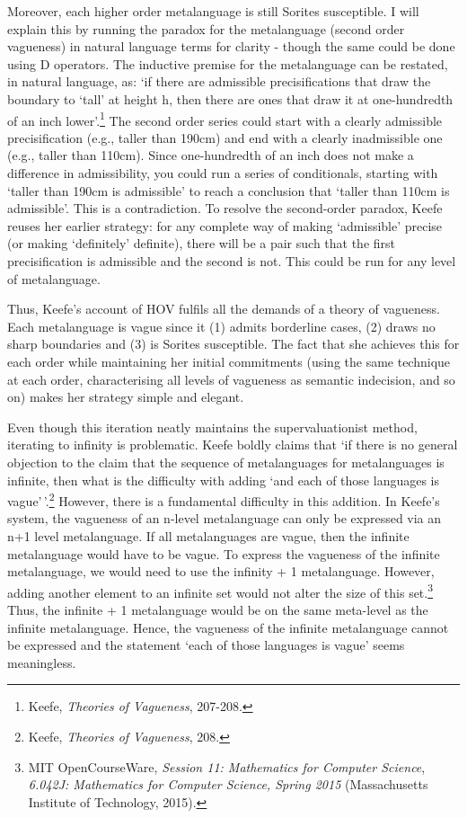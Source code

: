 Moreover, each higher order metalanguage is still Sorites susceptible. I
will explain this by running the paradox for the metalanguage (second
order vagueness) in natural language terms for clarity - though the same
could be done using D operators. The inductive premise for the
metalanguage can be restated, in natural language, as: `if there are
admissible precisifications that draw the boundary to `tall' at height
h, then there are ones that draw it at one-hundredth of an inch
lower'.\footnote{Keefe, \emph{Theories of Vagueness}, 207-208.} The
second order series could start with a clearly admissible
precisification (e.g., taller than 190cm) and end with a clearly
inadmissible one (e.g., taller than 110cm). Since one-hundredth of an
inch does not make a difference in admissibility, you could run a series
of conditionals, starting with `taller than 190cm is admissible' to
reach a conclusion that `taller than 110cm is admissible'. This is a
contradiction. To resolve the second-order paradox, Keefe reuses her
earlier strategy: for any complete way of making `admissible' precise
(or making `definitely' definite), there will be a pair such that the
first precisification is admissible and the second is not. This could be
run for any level of metalanguage.

Thus, Keefe's account of HOV fulfils all the demands of a theory of
vagueness. Each metalanguage is vague since it (1) admits borderline
cases, (2) draws no sharp boundaries and (3) is Sorites susceptible. The
fact that she achieves this for each order while maintaining her initial
commitments (using the same technique at each order, characterising all
levels of vagueness as semantic indecision, and so on) makes her
strategy simple and elegant.

Even though this iteration neatly maintains the supervaluationist
method, iterating to infinity is problematic. Keefe boldly claims that
`if there is no general objection to the claim that the sequence of
metalanguages for metalanguages is infinite, then what is the difficulty
with adding `and each of those languages is vague'\,'.\footnote{Keefe,
  \emph{Theories of Vagueness}, 208.} However, there is a fundamental
difficulty in this addition. In Keefe's system, the vagueness of an
n-level metalanguage can only be expressed via an n+1 level
metalanguage. If all metalanguages are vague, then the infinite
metalanguage would have to be vague. To express the vagueness of the
infinite metalanguage, we would need to use the infinity + 1
metalanguage. However, adding another element to an infinite set would
not alter the size of this set.\footnote{MIT OpenCourseWare,
  \emph{Session 11: Mathematics for Computer Science}, \emph{6.042J:
  Mathematics for Computer Science, Spring 2015} (Massachusetts
  Institute of Technology, 2015).}
Thus, the infinite + 1 metalanguage would be on the same meta-level as
the infinite metalanguage. Hence, the vagueness of the infinite
metalanguage cannot be expressed and the statement `each of those
languages is vague' seems meaningless.

